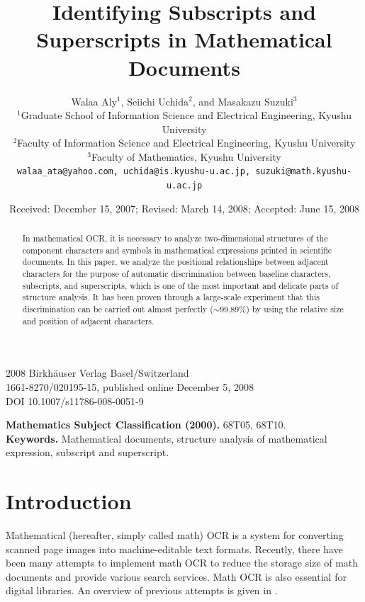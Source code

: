 \documentclass[10pt]{article}
\begin{document}
\title{Identifying Subscripts and Superscripts in Mathematical Documents}
\author{Walaa Aly$^{1}$, Seiichi Uchida$^{2}$, and Masakazu Suzuki$^{3}$\\
\small $^{1}$Graduate School of Information Science and Electrical Engineering, Kyushu University\\
\small $^{2}$Faculty of Information Science and Electrical Engineering, Kyushu University\\
\small $^{3}$Faculty of Mathematics, Kyushu University\\
\small \texttt{walaa\_ata@yahoo.com, uchida@is.kyushu-u.ac.jp, suzuki@math.kyushu-u.ac.jp}}
\date{Received: December 15, 2007; Revised: March 14, 2008; Accepted: June 15, 2008}

\maketitle

\begin{center}
\small 2008 Birkh\"auser Verlag Basel/Switzerland \\
1661-8270/020195-15, published online December 5, 2008 \\
DOI 10.1007/s11786-008-0051-9
\end{center}

\begin{abstract}
In mathematical OCR, it is necessary to analyze two-dimensional structures of the component characters and symbols in mathematical expressions printed in scientific documents. In this paper, we analyze the positional relationships between adjacent characters for the purpose of automatic discrimination between baseline characters, subscripts, and superscripts, which is one of the most important and delicate parts of structure analysis. It has been proven through a large-scale experiment that this discrimination can be carried out almost perfectly ($\sim 99.89\%$) by using the relative size and position of adjacent characters.
\end{abstract}

\noindent \textbf{Mathematics Subject Classification (2000).} 68T05, 68T10. \\
\textbf{Keywords.} Mathematical documents, structure analysis of mathematical expression, subscript and superscript.

\section{Introduction}
Mathematical (hereafter, simply called math) OCR is a system for converting scanned page images into machine-editable text formats. Recently, there have been many attempts to implement math OCR to reduce the storage size of math documents and provide various search services. Math OCR is also essential for digital libraries. An overview of previous attempts is given in \cite{Chan2000}.
\end{document}
